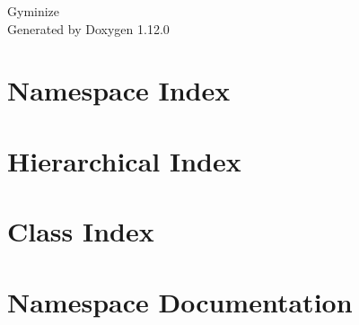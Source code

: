 \documentclass[twoside]{book}
\newcommand{\+}{\discretionary{\mbox{\scriptsize$\hookleftarrow$}}{}{}}
\newcommand{\clearemptydoublepage}{%
    \newpage{\pagestyle{empty}\cleardoublepage}%
  }
\begin{document}
  \raggedbottom
    \hypersetup{pageanchor=false,
                bookmarksnumbered=true,
                pdfencoding=unicode
               }
  \begin{titlepage}
  \vspace*{7cm}
  \begin{center}%
  {\Large Gyminize}\\
  \vspace*{1cm}
  {\large Generated by Doxygen 1.12.0}\\
  \end{center}
  \end{titlepage}
  \clearemptydoublepage
  \tableofcontents
  \clearemptydoublepage
  \hypersetup{pageanchor=true}
\chapter{Namespace Index}

\chapter{Hierarchical Index}

\chapter{Class Index}

\chapter{Namespace Documentation}















\end{document}
